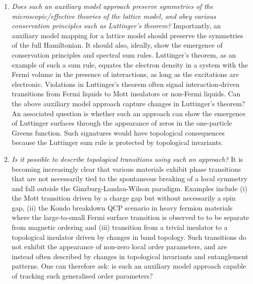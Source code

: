 \begin{enumerate}
	\item {\it Does such an auxiliary model approach preserve symmetries of the microscopic/effective theories of the lattice model, and obey various conservation principles such as Luttinger's theorem?} Importantly, an auxiliary model mapping for a lattice model should preserve the symmetries of the full Hamiltonian. It should also, ideally, show the emergence of conservation principles and spectral sum rules. Luttinger's theorem, as an example of such a sum rule, equates the electron density in a system with the Fermi volume in the presence of interactions, as long as the excitations are electronic. Violations in Luttinger's theorem often signal interaction-driven transitions from Fermi liquids to Mott insulators or non-Fermi liquids. Can the above auxiliary model approach capture changes in Luttinger's theorem? An associated question is whether such an approach can show the emergence of Luttinger surfaces through the appearance of zeros in the one-particle Greens function. Such signatures would have topological consequences because the Luttinger sum rule is protected by topological invariants.
	\item {\it Is it possible to describe topological transitions using such an approach?} It is becoming increasingly clear that various materials exhibit phase transitions that are not necessarily tied to the spontaneous breaking of a local symmetry and fall outside the Ginzburg-Landau-Wilson paradigm. Examples include (i) the Mott transition driven by a charge gap but without necessarily a spin gap, (ii) the Kondo breakdown QCP scenario in heavy fermion materials where the large-to-small Fermi surface transition is observed to to be separate from magnetic ordering and (iii) transition from a trivial insulator to a topological insulator driven by changes in band topology. Such transitions do not exhibit the appearance of non-zero local order parameters, and are instead often described by changes in topological invariants and entanglement patterns. One can therefore ask: is such an auxiliary model approach capable of tracking such generalised order parameters?

\end{enumerate}
